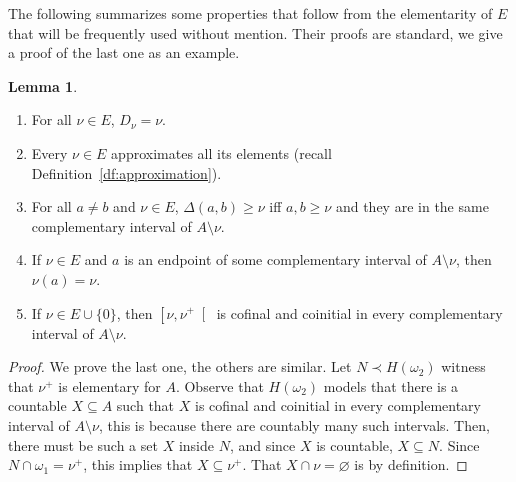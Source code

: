 \documentclass[10pt]{amsart}
\theoremstyle{definition}
\newtheorem{lemma}[theorem]{Lemma}
\theoremstyle{remark}
\newcommand{\es}{\varnothing}
\newcommand{\seb}{\subseteq}
\newcommand{\setm}{\setminus}
\newcommand{\1}{\mathbbm{1}}
\begin{document}
The following summarizes some properties that follow from the
elementarity of $E$ that will be frequently used without mention. Their
proofs are standard, we give a proof of the last one as an
example.

\begin{lemma}\label{lem:elementarity}
  \begin{enumerate}[label=(\alph*)]\itemsep0em
    \item For all $\nu \in E$, $D_{\nu} = \nu$.
    \item Every $\nu \in E$ approximates all its elements
    (recall Definition~\ref{df:approximation}).
    \item For all $a \neq b$ and $\nu \in E$, $\Delta(a,b) \ge \nu$ iff $a,b \ge \nu$
    and they are in the same complementary interval of $A \setm \nu$.
    \item If $\nu \in E$ and $a$ is an endpoint of some complementary interval of
    $A \setm \nu$, then $\nu(a) = \nu$.
    \item If $\nu \in E \cup \{0\}$,
    then $\left[\nu,\nu^{+}\right[$ is cofinal and coinitial in every complementary
    interval of $A \setm \nu$.
  \end{enumerate}
\end{lemma}
\begin{proof}
  We prove the last one, the others are similar. Let $N \prec H(\omega_{2})$
  witness that $\nu^{+}$ is elementary for $A$. Observe
  that $H(\omega_{2})$ models that there is a countable
  $X \seb A$ such that $X$ is cofinal and coinitial in every complementary
  interval of $A \setm \nu$, this is because there are countably many such intervals.
  Then, there must be such a set $X$ inside $N$, and since $X$ is countable,
  $X \seb N$. Since $N \cap \omega_{1} = \nu^{+}$,
  this implies that $X \seb \nu^{+}$.
  That $X \cap \nu = \es$ is by definition.
\end{proof}
\end{document}
